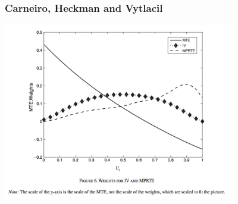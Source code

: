 \documentclass[xcolor=pdftex,dvipsnames,table,mathserif,aspectratio=169]{beamer}
\begin{document}
\begin{frame}
\frametitle{Carneiro, Heckman and Vytlacil}
\begin{center}
\includegraphics[width=4in]{./resources/chv_fig6}
\end{center}
\end{frame}
\end{document}
